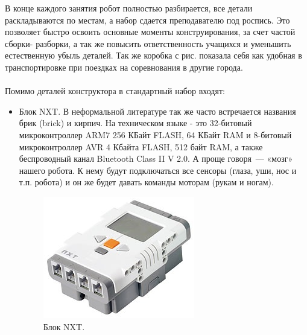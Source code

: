 В конце каждого занятия робот полностью разбирается, все детали раскладываются по местам, а набор сдается преподавателю под роспись. Это позволяет быстро освоить основные моменты конструирования, за счет частой сборки- разборки, а так же повысить ответственность учащихся и уменьшить естественную убыль деталей. Так же коробка с рис. показала себя как удобная в транспортировке при поездках на соревнования в другие города.\\\\	
Помимо деталей конструктора в стандартный набор входят:
\begin{itemize}
	\item Блок NXT. В неформальной литературе так же часто встречается названия брик (brick) и кирпич. На техническом языке  - это 32-битовый микроконтроллер ARM7 256 КБайт FLASH, 64 КБайт RAM  и 8-битовый микроконтроллер AVR 4 Кбайта FLASH, 512 байт RAM, а также беспроводный канал Bluetooth Class II V 2.0. А проще говоря~--- «мозг» нашего робота. К нему будут подключаться все сенсоры (глаза, уши, нос и т.п. робота) и он же будет давать команды моторам (рукам и ногам).
	\clearpage
	\begin{figure}[h!]
		\begin{center}
			\includegraphics[width=0.65\linewidth]{chapters/chapter2/images/4}
			\caption{Блок NXT.}
			\label{ris:image2x4}
		\end{center}
	\end{figure}	
	

\end{itemize}
